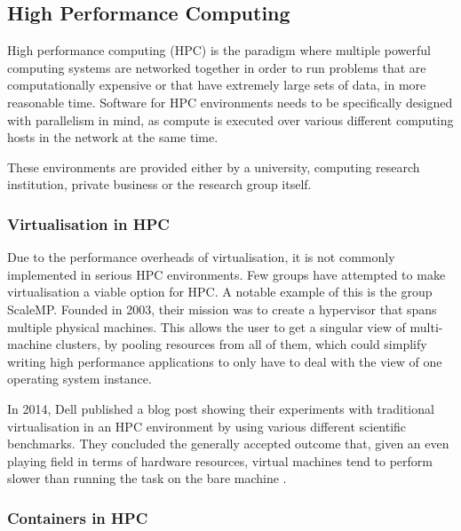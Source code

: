 

\subsection{High Performance Computing}

High performance computing (HPC) is the paradigm where multiple powerful computing systems are networked together in order to run problems that are computationally expensive or that have extremely large sets of data, in more reasonable time. Software for HPC environments needs to be specifically designed with parallelism in mind, as compute is executed over various different computing hosts in the network at the same time.

These environments are provided either by a university, computing research institution, private business or the research group itself.

\subsubsection{Virtualisation in HPC}

Due to the performance overheads of virtualisation, it is not commonly implemented in serious HPC environments. Few groups have attempted to make virtualisation a viable option for HPC. A notable example of this is the group ScaleMP. Founded in 2003, their mission was to create a hypervisor that spans multiple physical machines. This allows the user to get a singular view of multi-machine clusters, by pooling resources from all of them, which could simplify writing high performance applications to only have to deal with the view of one operating system instance.

In 2014, Dell published a blog post showing their experiments with traditional virtualisation in an HPC environment by using various different scientific benchmarks. They concluded the generally accepted outcome that, given an even playing field in terms of hardware resources, virtual machines tend to perform slower than running the task on the bare machine \parencite{dell_container_perf}.

\subsubsection{Containers in HPC}

